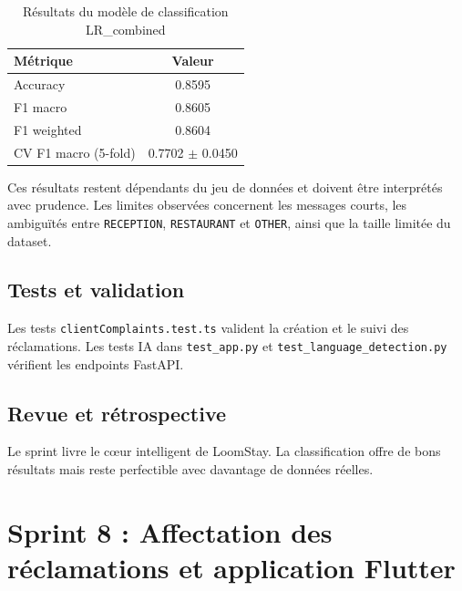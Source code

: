 \begin{table}[H]
\centering
\caption{Résultats du modèle de classification LR\_combined}
\begin{tabular}{|l|c|}
\hline
\textbf{Métrique} & \textbf{Valeur} \\ \hline
Accuracy & 0.8595 \\ \hline
F1 macro & 0.8605 \\ \hline
F1 weighted & 0.8604 \\ \hline
CV F1 macro (5-fold) & 0.7702 $\pm$ 0.0450 \\ \hline
\end{tabular}
\label{tab:classification_results}
\end{table}

Ces résultats restent dépendants du jeu de données et doivent être interprétés avec prudence. Les limites observées concernent les messages courts, les ambiguïtés entre \texttt{RECEPTION}, \texttt{RESTAURANT} et \texttt{OTHER}, ainsi que la taille limitée du dataset.

\subsection{Tests et validation}
Les tests \texttt{clientComplaints.test.ts} valident la création et le suivi des réclamations. Les tests IA dans \texttt{test\_app.py} et \texttt{test\_language\_detection.py} vérifient les endpoints FastAPI.

\subsection{Revue et rétrospective}
Le sprint livre le cœur intelligent de LoomStay. La classification offre de bons résultats mais reste perfectible avec davantage de données réelles.


\section{Sprint 8 : Affectation des réclamations et application Flutter}
\label{sec:sprint8}


